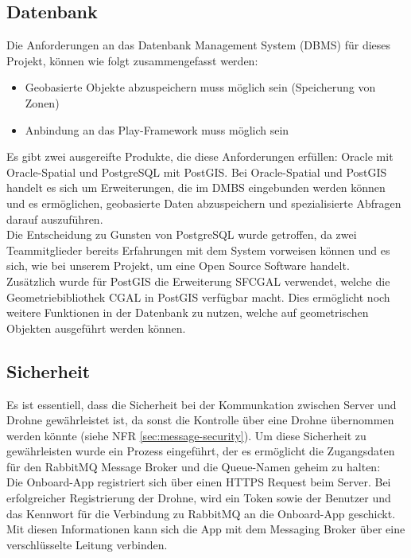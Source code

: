 \subsection{Datenbank}

Die Anforderungen an das Datenbank Management System (\Gls{DBMS}) für dieses Projekt, können wie folgt zusammengefasst werden:

\begin{itemize}
	\item Geobasierte Objekte abzuspeichern muss möglich sein (Speicherung von Zonen)
	\item Anbindung an das Play-Framework muss möglich sein
\end{itemize}

Es gibt zwei ausgereifte Produkte, die diese Anforderungen erfüllen: Oracle mit Oracle-Spatial und PostgreSQL mit PostGIS. Bei Oracle-Spatial und PostGIS handelt es sich um Erweiterungen, die im DMBS eingebunden werden können und es ermöglichen, geobasierte Daten abzuspeichern und spezialisierte Abfragen darauf auszuführen. \\

Die Entscheidung zu Gunsten von PostgreSQL wurde getroffen, da zwei Teammitglieder bereits Erfahrungen mit dem System vorweisen können und es sich, wie bei unserem Projekt, um eine Open Source Software handelt. \\

Zusätzlich wurde für PostGIS die Erweiterung \Gls{SFCGAL} verwendet, welche die Geometriebibliothek \Gls{CGAL} in PostGIS verfügbar macht. Dies ermöglicht noch weitere Funktionen in der Datenbank zu nutzen, welche auf geometrischen Objekten ausgeführt werden können.

\subsection{Sicherheit}
Es ist essentiell, dass die Sicherheit bei der Kommunkation zwischen Server und Drohne gewährleistet ist, da sonst die Kontrolle über eine Drohne übernommen werden könnte (siehe NFR \ref{sec:message-security}). Um diese Sicherheit zu gewährleisten wurde ein Prozess eingeführt, der es ermöglicht die Zugangsdaten für den RabbitMQ Message Broker und die Queue-Namen geheim zu halten: \\

Die Onboard-App registriert sich über einen HTTPS Request beim Server. Bei erfolgreicher Registrierung der Drohne, wird ein Token sowie der Benutzer und das Kennwort für die Verbindung zu RabbitMQ an die Onboard-App geschickt. Mit diesen Informationen kann sich die App mit dem Messaging Broker über eine verschlüsselte Leitung verbinden.\\

